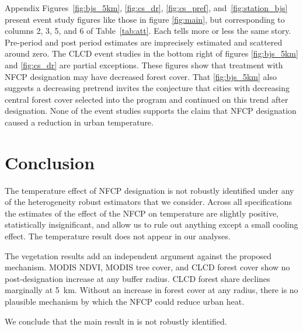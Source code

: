 \documentclass[12pt]{article}
\begin{document}
Appendix Figures~\ref{fig:bjs_5km}, \ref{fig:cs_dr},  \ref{fig:cs_pref}, and~\ref{fig:station_bjs} present event study figures like those in figure \ref{fig:main}, but corresponding to columns 2, 3, 5, and 6 of Table~\ref{tab:att}. Each tells more or less the same story. Pre-period and post period estimates are imprecisely estimated and scattered around zero. The CLCD event studies in the bottom right of figures \ref{fig:bjs_5km} and \ref{fig:cs_dr} are partial exceptions. These figures show that treatment with NFCP designation may have decreased forest cover.  That \ref{fig:bjs_5km} also suggests a decreasing pretrend invites the conjecture that cities with decreasing central forest cover selected into the program and continued on this trend after designation.  None of the event studies  supports  the \citet{Ma2026} claim that NFCP designation caused a reduction in urban temperature.

\section{Conclusion}
\label{sec:conclusion}

The temperature effect of NFCP designation is not robustly identified under
any of the heterogeneity robust estimators that we consider.
Across all specifications the estimates of the effect of the NFCP on temperature are slightly positive, statistically insignificant, and allow us to rule out anything except a small cooling effect. The \citet{Ma2026} temperature result does not appear in our analyses.

The vegetation results add an independent argument against the proposed
mechanism.  MODIS NDVI, MODIS tree cover, and CLCD forest cover show no
post-designation increase at any buffer radius.  CLCD forest share declines
marginally at 5~km.  Without an increase in forest cover at any radius, there is no plausible mechanism by which the NFCP could reduce urban heat.

We conclude that the main result in \citet{Ma2026} is not robustly identified.




\appendix
\setcounter{figure}{0}
\renewcommand{\thefigure}{A\arabic{figure}}
\setcounter{table}{0}
\renewcommand{\thetable}{A\arabic{table}}
\FloatBarrier
\end{document}
